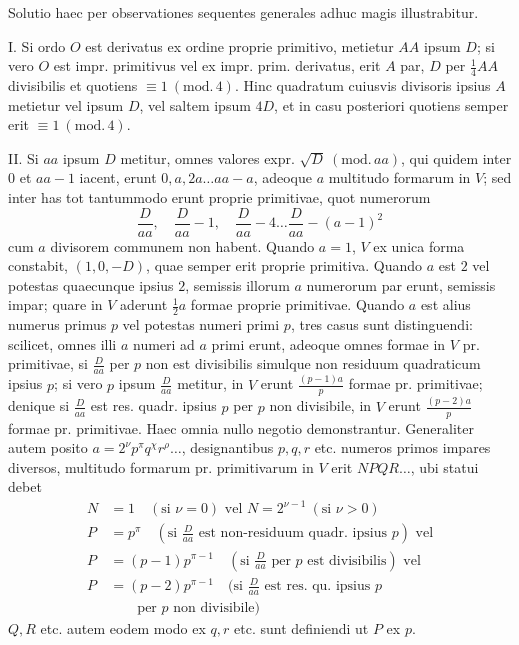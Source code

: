 Solutio haec per observationes sequentes generales adhuc magis illustrabitur.

I. Si ordo \(O\) est derivatus ex ordine proprie primitivo, metietur \(AA\) ipsum \(D\); si vero \(O\) est impr. primitivus vel ex impr. prim. derivatus, erit \(A\) par, \(D\) per \(\frac14 AA\) divisibilis et quotiens \(\equiv1\ (\mathrm{mod.}\,4)\). Hinc quadratum cuiusvis divisoris ipsius \(A\) metietur vel ipsum \(D\), vel saltem ipsum \(4D\), et in casu posteriori quotiens semper erit \(\equiv1\ (\mathrm{mod.}\,4)\).

II. Si \(aa\) ipsum \(D\) metitur, omnes valores expr. \(\surd D\ (\mathrm{mod.}\,aa)\), qui quidem inter \(0\) et \(aa-1\) iacent, erunt \(0,a,2a\ldots aa-a\), adeoque \(a\) multitudo formarum in \(V\); sed inter has tot tantummodo erunt proprie primitivae, quot numerorum
\[
\frac{D}{aa},\quad\frac{D}{aa}-1,\quad\frac{D}{aa}-4\ldots\frac{D}{aa}-(a-1)^2
\]
cum \(a\) divisorem communem non habent. Quando \(a=1\), \(V\) ex unica forma constabit, \((1,0,-D)\), quae semper erit proprie primitiva. Quando \(a\) est \(2\) vel potestas quaecunque ipsius \(2\), semissis illorum \(a\) numerorum par erunt, semissis impar; quare in \(V\) aderunt \(\frac12 a\) formae proprie primitivae. Quando \(a\) est alius numerus primus \(p\) vel potestas numeri primi \(p\), tres casus sunt distinguendi: scilicet, omnes illi \(a\) numeri ad \(a\) primi erunt, adeoque omnes formae in \(V\) pr. primitivae, si \(\frac{D}{aa}\) per \(p\) non est divisibilis simulque non residuum quadraticum ipsius \(p\); si vero \(p\) ipsum \(\frac{D}{aa}\) metitur, in \(V\) erunt \(\frac{(p-1)a}{p}\) formae pr. primitivae; denique si \(\frac{D}{aa}\) est res. quadr. ipsius \(p\) per \(p\) non divisibile, in \(V\) erunt \(\frac{(p-2)a}{p}\) formae pr. primitivae. Haec omnia nullo negotio demonstrantur. Generaliter autem posito \(a=2^\nu p^\pi q^\chi r^\rho\ldots\), designantibus \(p,q,r\) etc. numeros primos impares diversos, multitudo formarum pr. primitivarum in \(V\) erit \(NPQR\ldots\), ubi statui debet
\[
\begin{aligned}
N&=1\quad(\text{si }\nu=0)\text{ vel }N=2^{\nu-1}\ (\text{si }\nu>0)\\
P&=p^\pi\quad(\text{si }\tfrac{D}{aa}\text{ est non-residuum quadr. ipsius }p)\text{ vel}\\
P&=(p-1)p^{\pi-1}\quad(\text{si }\tfrac{D}{aa}\text{ per }p\text{ est divisibilis})\text{ vel}\\
P&=(p-2)p^{\pi-1}\quad(\text{si }\tfrac{D}{aa}\text{ est res. qu. ipsius }p\\ &\qquad\text{per }p\text{ non divisibile})
\end{aligned}
\]
\(Q,R\) etc. autem eodem modo ex \(q,r\) etc. sunt definiendi ut \(P\) ex \(p\).

